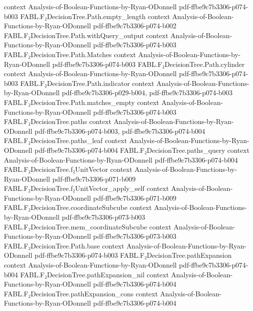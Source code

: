 \begin{theorem}
  {context}
  {Analysis-of-Boolean-Functions-by-Ryan-ODonnell}
  {pdf-ffbe9c7b3306-p074-b003}
\proofstep
  {FABL.F₂DecisionTree.Path.empty_length}
  {context}
  {Analysis-of-Boolean-Functions-by-Ryan-ODonnell}
  {pdf-ffbe9c7b3306-p074-b002}
\proofstep
  {FABL.F₂DecisionTree.Path.withQuery_output}
  {context}
  {Analysis-of-Boolean-Functions-by-Ryan-ODonnell}
  {pdf-ffbe9c7b3306-p074-b003}
\proofstep
  {FABL.F₂DecisionTree.Path.Matches}
  {context}
  {Analysis-of-Boolean-Functions-by-Ryan-ODonnell}
  {pdf-ffbe9c7b3306-p074-b003}
\proofstep
  {FABL.F₂DecisionTree.Path.cylinder}
  {context}
  {Analysis-of-Boolean-Functions-by-Ryan-ODonnell}
  {pdf-ffbe9c7b3306-p074-b003}
\proofstep
  {FABL.F₂DecisionTree.Path.indicator}
  {context}
  {Analysis-of-Boolean-Functions-by-Ryan-ODonnell}
  {pdf-ffbe9c7b3306-p029-b004,
    pdf-ffbe9c7b3306-p074-b003}
\proofstep
  {FABL.F₂DecisionTree.Path.matches_empty}
  {context}
  {Analysis-of-Boolean-Functions-by-Ryan-ODonnell}
  {pdf-ffbe9c7b3306-p074-b003}
\proofstep
  {FABL.F₂DecisionTree.paths}
  {context}
  {Analysis-of-Boolean-Functions-by-Ryan-ODonnell}
  {pdf-ffbe9c7b3306-p074-b003,
    pdf-ffbe9c7b3306-p074-b004}
\proofstep
  {FABL.F₂DecisionTree.paths_leaf}
  {context}
  {Analysis-of-Boolean-Functions-by-Ryan-ODonnell}
  {pdf-ffbe9c7b3306-p074-b004}
\proofstep
  {FABL.F₂DecisionTree.paths_query}
  {context}
  {Analysis-of-Boolean-Functions-by-Ryan-ODonnell}
  {pdf-ffbe9c7b3306-p074-b004}
\proofstep
  {FABL.F₂DecisionTree.f₂UnitVector}
  {context}
  {Analysis-of-Boolean-Functions-by-Ryan-ODonnell}
  {pdf-ffbe9c7b3306-p071-b009}
\proofstep
  {FABL.F₂DecisionTree.f₂UnitVector_apply_self}
  {context}
  {Analysis-of-Boolean-Functions-by-Ryan-ODonnell}
  {pdf-ffbe9c7b3306-p071-b009}
\proofstep
  {FABL.F₂DecisionTree.coordinateSubcube}
  {context}
  {Analysis-of-Boolean-Functions-by-Ryan-ODonnell}
  {pdf-ffbe9c7b3306-p073-b003}
\proofstep
  {FABL.F₂DecisionTree.mem_coordinateSubcube}
  {context}
  {Analysis-of-Boolean-Functions-by-Ryan-ODonnell}
  {pdf-ffbe9c7b3306-p073-b003}
\proofstep
  {FABL.F₂DecisionTree.Path.base}
  {context}
  {Analysis-of-Boolean-Functions-by-Ryan-ODonnell}
  {pdf-ffbe9c7b3306-p074-b003}
\proofstep
  {FABL.F₂DecisionTree.pathExpansion}
  {context}
  {Analysis-of-Boolean-Functions-by-Ryan-ODonnell}
  {pdf-ffbe9c7b3306-p074-b004}
\proofstep
  {FABL.F₂DecisionTree.pathExpansion_nil}
  {context}
  {Analysis-of-Boolean-Functions-by-Ryan-ODonnell}
  {pdf-ffbe9c7b3306-p074-b004}
\proofstep
  {FABL.F₂DecisionTree.pathExpansion_cons}
  {context}
  {Analysis-of-Boolean-Functions-by-Ryan-ODonnell}
  {pdf-ffbe9c7b3306-p074-b004}

\end{theorem}
